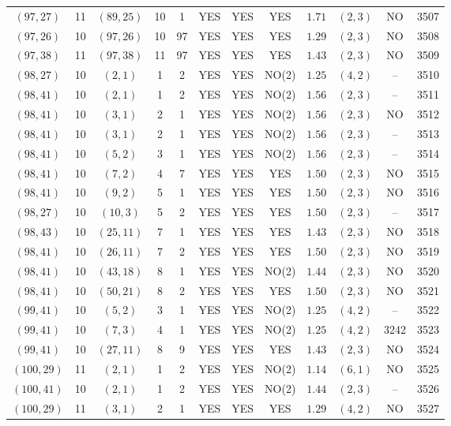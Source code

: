 \begin{longtable}{|c|c|c|c|c|c|c|c|c|c|c|c|}
$(97,27)$ & 11 & $(89,25)$ & 10 & 1 & YES & YES & YES & $1.71$ & $(2,3)$ & NO & 3507\\
$(97,26)$ & 10 & $(97,26)$ & 10 & 97 & YES & YES & YES & $1.29$ & $(2,3)$ & NO & 3508\\
$(97,38)$ & 11 & $(97,38)$ & 11 & 97 & YES & YES & YES & $1.43$ & $(2,3)$ & NO & 3509\\
$(98,27)$ & 10 & $(2,1)$ & 1 & 2 & YES & YES & NO(2) & $1.25$ & $(4,2)$ & -- & 3510\\
$(98,41)$ & 10 & $(2,1)$ & 1 & 2 & YES & YES & NO(2) & $1.56$ & $(2,3)$ & -- & 3511\\
$(98,41)$ & 10 & $(3,1)$ & 2 & 1 & YES & YES & NO(2) & $1.56$ & $(2,3)$ & NO & 3512\\
$(98,41)$ & 10 & $(3,1)$ & 2 & 1 & YES & YES & NO(2) & $1.56$ & $(2,3)$ & -- & 3513\\
$(98,41)$ & 10 & $(5,2)$ & 3 & 1 & YES & YES & NO(2) & $1.56$ & $(2,3)$ & -- & 3514\\
$(98,41)$ & 10 & $(7,2)$ & 4 & 7 & YES & YES & YES & $1.50$ & $(2,3)$ & NO & 3515\\
$(98,41)$ & 10 & $(9,2)$ & 5 & 1 & YES & YES & YES & $1.50$ & $(2,3)$ & NO & 3516\\
$(98,27)$ & 10 & $(10,3)$ & 5 & 2 & YES & YES & YES & $1.50$ & $(2,3)$ & -- & 3517\\
$(98,43)$ & 10 & $(25,11)$ & 7 & 1 & YES & YES & YES & $1.43$ & $(2,3)$ & NO & 3518\\
$(98,41)$ & 10 & $(26,11)$ & 7 & 2 & YES & YES & YES & $1.50$ & $(2,3)$ & NO & 3519\\
$(98,41)$ & 10 & $(43,18)$ & 8 & 1 & YES & YES & NO(2) & $1.44$ & $(2,3)$ & NO & 3520\\
$(98,41)$ & 10 & $(50,21)$ & 8 & 2 & YES & YES & YES & $1.50$ & $(2,3)$ & NO & 3521\\
$(99,41)$ & 10 & $(5,2)$ & 3 & 1 & YES & YES & NO(2) & $1.25$ & $(4,2)$ & -- & 3522\\
$(99,41)$ & 10 & $(7,3)$ & 4 & 1 & YES & YES & NO(2) & $1.25$ & $(4,2)$ & 3242 & 3523\\
$(99,41)$ & 10 & $(27,11)$ & 8 & 9 & YES & YES & YES & $1.43$ & $(2,3)$ & NO & 3524\\
$(100,29)$ & 11 & $(2,1)$ & 1 & 2 & YES & YES & NO(2) & $1.14$ & $(6,1)$ & NO & 3525\\
$(100,41)$ & 10 & $(2,1)$ & 1 & 2 & YES & YES & NO(2) & $1.44$ & $(2,3)$ & -- & 3526\\
$(100,29)$ & 11 & $(3,1)$ & 2 & 1 & YES & YES & YES & $1.29$ & $(4,2)$ & NO & 3527\\

\end{longtable}
